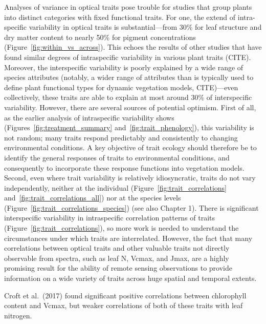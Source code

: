 Analyses of variance in optical traits pose trouble for studies that group plants into distinct categories with fixed functional traits.
For one, the extend of intra-specific variability in optical traits is substantial---from 30\% for leaf structure and dry matter content to nearly 50\% for pigment concentrations (Figure~\ref{fig:within_vs_across}).
% 
% 
This echoes the results of other studies that have found similar degrees of intraspecific variability in various plant traits (CITE).
Moreover, the interspecific variability is poorly explained by a wide range of species attributes (notably, a wider range of attributes than is typically used to define plant functional types for dynamic vegetation models, CITE)---even collectively, these traits are able to explain at most around 30\% of interspecific variability.
However, there are several sources of potential optimism.
First of all, as the earlier analysis of intraspecific variability shows (Figures~\ref{fig:treatment_summary} and~\ref{fig:trait_phenology}), this variability is not random; many traits respond predictably and consistently to changing environmental conditions.
A key objective of trait ecology should therefore be to identify the general responses of traits to environmental conditions, and consequently to incorporate these response functions into vegetation models.
% 
% 
% 
Second, even where trait variability is relatively idiosyncratic, traits do not vary independently, neither at the individual (Figure~\ref{fig:trait_correlations} and~\ref{fig:trait_correlations_all}) nor at the species levels (Figure~\ref{fig:trait_correlations_species}) (see also Chapter 1).
There is significant interspecific variability in intraspecific correlation patterns of traits (Figure~\ref{fig:trait_correlations}), so more work is needed to understand the circumstances under which traits are interrelated.
% 
% 
However, the fact that many correlations between optical traits and other valuable traits not directly observable from spectra, such as leaf N, Vcmax, and Jmax, are a highly promising result for the ability of remote sensing observations to provide information on a wide variety of traits across huge spatial and temporal extents.

Croft et al.~(2017) \nocite{croft_2017_chlorophyll} found significant positive correlations between chlorophyll content and Vcmax, but weaker correlations of both of these traits with leaf nitrogen. %
